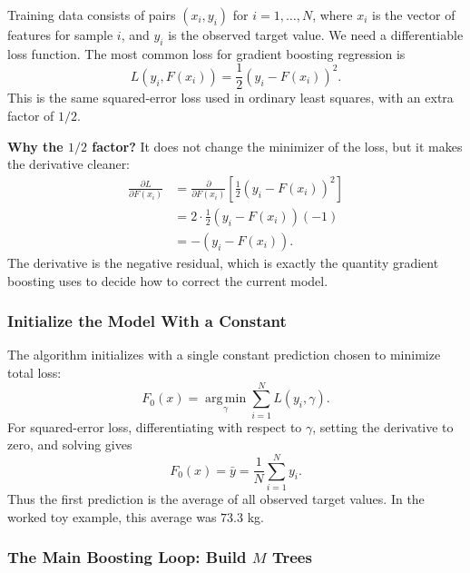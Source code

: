 \documentclass[12pt,openany]{book}
\begin{document}
Training data consists of pairs \((x_i,y_i)\) for \(i=1,\dots,N\), where \(x_i\) is the vector of features for sample \(i\), and \(y_i\) is the observed target value. We need a differentiable loss function. The most common loss for gradient boosting regression is
\begin{equation*}
    L\left(y_i,F(x_i)\right)
    = \frac{1}{2}\left(y_i-F(x_i)\right)^2.
\end{equation*}
This is the same squared-error loss used in ordinary least squares, with an extra factor of \(1/2\).

\textbf{Why the \(1/2\) factor?} It does not change the minimizer of the loss, but it makes the derivative cleaner:
\begin{equation*}
\begin{aligned}
    \frac{\partial L}{\partial F(x_i)}
    &= \frac{\partial}{\partial F(x_i)}
       \left[\frac{1}{2}\left(y_i-F(x_i)\right)^2\right] \\
    &= 2\cdot\frac{1}{2}\left(y_i-F(x_i)\right)(-1) \\
    &= -\left(y_i-F(x_i)\right).
\end{aligned}
\end{equation*}
The derivative is the negative residual, which is exactly the quantity gradient boosting uses to decide how to correct the current model.

\subsubsection{Initialize the Model With a Constant}

The algorithm initializes with a single constant prediction chosen to minimize total loss:
\begin{equation*}
    F_0(x)=\operatorname*{arg\,min}_{\gamma}
    \sum_{i=1}^{N} L(y_i,\gamma).
\end{equation*}
For squared-error loss, differentiating with respect to \(\gamma\), setting the derivative to zero, and solving gives
\begin{equation*}
    F_0(x)=\bar{y}=\frac{1}{N}\sum_{i=1}^{N}y_i.
\end{equation*}
Thus the first prediction is the average of all observed target values. In the worked toy example, this average was \(73.3\) kg.

\subsubsection{The Main Boosting Loop: Build \(M\) Trees}
\end{document}
